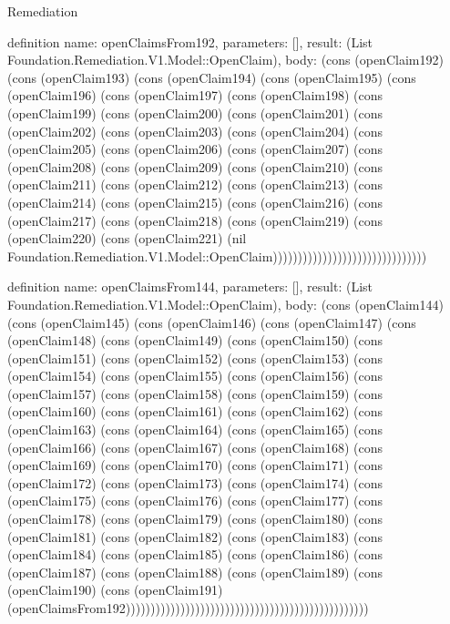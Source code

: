 \begin{lexlean}{Remediation}
\begin{semanticmodule}
definition{
  name: openClaimsFrom192,
  parameters: [],
  result: (List Foundation.Remediation.V1.Model::OpenClaim),
  body: (cons (openClaim192) (cons (openClaim193) (cons (openClaim194) (cons (openClaim195) (cons (openClaim196) (cons (openClaim197) (cons (openClaim198) (cons (openClaim199) (cons (openClaim200) (cons (openClaim201) (cons (openClaim202) (cons (openClaim203) (cons (openClaim204) (cons (openClaim205) (cons (openClaim206) (cons (openClaim207) (cons (openClaim208) (cons (openClaim209) (cons (openClaim210) (cons (openClaim211) (cons (openClaim212) (cons (openClaim213) (cons (openClaim214) (cons (openClaim215) (cons (openClaim216) (cons (openClaim217) (cons (openClaim218) (cons (openClaim219) (cons (openClaim220) (cons (openClaim221) (nil Foundation.Remediation.V1.Model::OpenClaim)))))))))))))))))))))))))))))))
}

definition{
  name: openClaimsFrom144,
  parameters: [],
  result: (List Foundation.Remediation.V1.Model::OpenClaim),
  body: (cons (openClaim144) (cons (openClaim145) (cons (openClaim146) (cons (openClaim147) (cons (openClaim148) (cons (openClaim149) (cons (openClaim150) (cons (openClaim151) (cons (openClaim152) (cons (openClaim153) (cons (openClaim154) (cons (openClaim155) (cons (openClaim156) (cons (openClaim157) (cons (openClaim158) (cons (openClaim159) (cons (openClaim160) (cons (openClaim161) (cons (openClaim162) (cons (openClaim163) (cons (openClaim164) (cons (openClaim165) (cons (openClaim166) (cons (openClaim167) (cons (openClaim168) (cons (openClaim169) (cons (openClaim170) (cons (openClaim171) (cons (openClaim172) (cons (openClaim173) (cons (openClaim174) (cons (openClaim175) (cons (openClaim176) (cons (openClaim177) (cons (openClaim178) (cons (openClaim179) (cons (openClaim180) (cons (openClaim181) (cons (openClaim182) (cons (openClaim183) (cons (openClaim184) (cons (openClaim185) (cons (openClaim186) (cons (openClaim187) (cons (openClaim188) (cons (openClaim189) (cons (openClaim190) (cons (openClaim191) (openClaimsFrom192)))))))))))))))))))))))))))))))))))))))))))))))))
}


\end{semanticmodule}
\end{lexlean}
